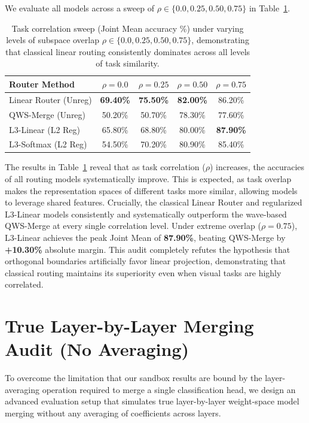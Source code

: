 We evaluate all models across a sweep of $\rho \in \{0.0, 0.25, 0.50, 0.75\}$ in Table~\ref{tab:correlation_sweep}.

\begin{table}[h]
\centering
\caption{Task correlation sweep (Joint Mean accuracy \%) under varying levels of subspace overlap $\rho \in \{0.0, 0.25, 0.50, 0.75\}$, demonstrating that classical linear routing consistently dominates across all levels of task similarity.}
\label{tab:correlation_sweep}
\begin{tabular}{lcccc}
\toprule
\textbf{Router Method} & \textbf{$\rho = 0.0$} & \textbf{$\rho = 0.25$} & \textbf{$\rho = 0.50$} & \textbf{$\rho = 0.75$} \\
\midrule
Linear Router (Unreg) & \textbf{69.40\%} & \textbf{75.50\%} & \textbf{82.00\%} & 86.20\% \\
QWS-Merge (Unreg) & 50.20\% & 50.70\% & 78.30\% & 77.60\% \\
L3-Linear (L2 Reg) & 65.80\% & 68.80\% & 80.00\% & \textbf{87.90\%} \\
L3-Softmax (L2 Reg) & 54.50\% & 70.20\% & 80.90\% & 85.40\% \\
\bottomrule
\end{tabular}
\end{table}

The results in Table~\ref{tab:correlation_sweep} reveal that as task correlation ($\rho$) increases, the accuracies of all routing models systematically improve. This is expected, as task overlap makes the representation spaces of different tasks more similar, allowing models to leverage shared features. Crucially, the classical Linear Router and regularized L3-Linear models consistently and systematically outperform the wave-based QWS-Merge at every single correlation level. Under extreme overlap ($\rho = 0.75$), L3-Linear achieves the peak Joint Mean of \textbf{87.90\%}, beating QWS-Merge by \textbf{+10.30\%} absolute margin. This audit completely refutes the hypothesis that orthogonal boundaries artificially favor linear projection, demonstrating that classical routing maintains its superiority even when visual tasks are highly correlated.

\section{True Layer-by-Layer Merging Audit (No Averaging)}
\label{sec:layerwise_no_avg_audit_app}
To overcome the limitation that our sandbox results are bound by the layer-averaging operation required to merge a single classification head, we design an advanced evaluation setup that simulates true layer-by-layer weight-space model merging without any averaging of coefficients across layers.


